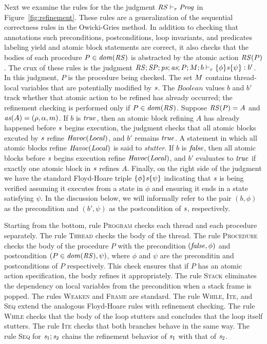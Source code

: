Next we examine the rules for the the judgment $\mathit{RS} \vdash_r \mathit{Prog}$ in Figure~\ref{fig:refinement}.
These rules are a generalization of the sequential correctness rules in the Owicki-Gries method.
In addition to checking that annotations such preconditions, postconditions, loop invariants, 
and predicates labeling yield and atomic block statements are correct, it also checks that the bodies
of each procedure $P \in \mathit{dom}(\mathit{RS})$ is abstracted by the atomic action $\mathit{RS}(P)$.
The crux of these rules is the judgment $\mathit{RS};\mathit{SP};\mathit{ps};\mathit{as};P;M;b \vdash_r \{\phi\} \mathit{s} \{\psi\} : b'$.
In this judgment, $P$ is the procedure being checked.
The set $M$ contains thread-local variables that are potentially modified by $\mathit{s}$.
The $\mathit{Boolean}$ values $b$ and $b'$ track whether that atomic action to be refined has already occurred;
the refinement checking is performed only if $P \in \mathit{dom}(\mathit{RS})$.
Suppose $\mathit{RS}(P) = A$ and $\mathit{as}(A) = (\rho, \alpha, m)$.
If $b$ is $\mathit{true}$, then an atomic block refining $A$ has already happened before $\mathit{s}$ begins execution, 
the judgment checks that all atomic blocks excuted by $\mathit{s}$ refine $\mathit{Havoc}(\mathit{Local})$, and $b'$ remains $\mathit{true}$.
A statement in which all atomic blocks refine $\mathit{Havoc}(\mathit{Local})$ is said to {\em stutter}.
If $b$ is $\mathit{false}$, then all atomic blocks before $\mathit{s}$ begins execution refine $\mathit{Havoc}(\mathit{Local})$,
and $b'$ evaluates to $\mathit{true}$ if exactly one atomic block in $\mathit{s}$ refines $A$.
Finally, on the right side of the judgment we have the standard Floyd-Hoare triple $\{\phi\} \mathit{s} \{\psi\}$ 
indicating that $\mathit{s}$ is being verified assuming it executes from a state in $\phi$ and ensuring it ends in a state satisfying $\psi$.
In the discussion below, we will informally refer to the pair $(b,\phi)$ as the precondition and $(b',\psi)$
as the postcondition of $\mathit{s}$, respectively.

Starting from the bottom, rule \textsc{Program} checks each thread and each procedure separately.
The rule \textsc{Thread} checks the body of the thread.
The rule \textsc{Procedure} checks the body of the procedure $P$ with
the precondition $(\mathit{false},\phi)$ and postcondition $(P \in \mathit{dom}(\mathit{RS}),\psi)$,
where $\phi$ and $\psi$ are the preconditin and postconditions of $P$ respectively.
This check ensures that if $P$ has an atomic action specification, the body refines it appropriately.
The rule \textsc{Stack} eliminates the dependency on local variables from the precondition when a stack frame is popped.
The rules \textsc{Weaken} and \textsc{Frame} are standard.
The rule \textsc{While}, \textsc{Ite}, and \textsc{Seq} extend the analogous Floyd-Hoare rules with refinement checking.
The rule \textsc{While} checks that the body of the loop stutters and concludes that the loop itself stutters.
The rule \textsc{Ite} checks that both branches behave in the same way.
The rule \textsc{Seq} for $\mathit{s}_1;\mathit{s}_2$ chains the refinement behavior of $\mathit{s}_1$ with that of $\mathit{s}_2$.

